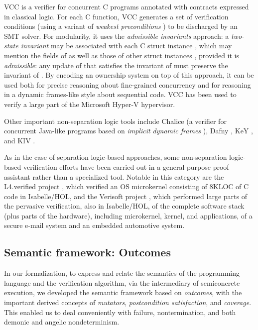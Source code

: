 \documentclass{CSML}
\theoremstyle{definition}\newtheorem{notation}[thm]{Notation}
\theoremstyle{plain}\newtheorem{satz}[thm]{Satz}
\begin{document}
VCC \cite{DBLP:conf/tphol/CohenDHLMSST09} is a verifier for concurrent C 
programs annotated with contracts expressed in classical logic. For each C 
function, VCC generates a set of verification conditions (using a variant 
of \emph{weakest preconditions} \cite{weakest-preconditions}) to be 
discharged by an SMT solver. For modularity, it uses the \emph{admissible 
invariants} approach: a \emph{two-state invariant} may be associated with 
each C struct instance , which may mention the fields of  as well as 
those of other struct instances , provided it is \emph{admissible}: 
any update of  that satisfies the invariant of  must preserve 
the invariant of . By encoding an ownership system on top of this 
approach, it can be used both for precise reasoning about fine-grained 
concurrency and for reasoning in a dynamic frames-like style about 
sequential code. VCC has been used to verify a large part of the Microsoft 
Hyper-V hypervisor. 

Other important non-separation logic tools include Chalice \cite{chalice} 
(a verifier for concurrent Java-like programs based on \emph{implicit 
dynamic frames} \cite{DBLP:journals/toplas/SmansJP12}), Dafny 
\cite{DBLP:conf/vstte/Leino12}, KeY \cite{DBLP:conf/fmoods/AhrendtBHS07}, 
and KIV \cite{kiv}.

As in the case of separation logic-based approaches, some non-separation 
logic-based verification efforts have been carried out in a 
general-purpose proof assistant rather than a specialized tool. Notable in 
this category are the L4.verified project \cite{Klein_EHACDEEKNSTW_09}, 
which verified an OS microkernel consisting of 8KLOC of C code in 
Isabelle/HOL, and the Verisoft project \cite{Alkassar:VSTTE2010-71}, which 
performed large parts of the pervasive verification, also in Isabelle/HOL, 
of the complete software stack (plus parts of the hardware), including 
microkernel, kernel, and applications, of a secure e-mail system and an 
embedded automotive system.

\subsection{Semantic framework: Outcomes}

In our formalization, to express and relate the semantics of the 
programming language and the verification algorithm, via the intermediary 
of semiconcrete execution, we developed the semantic framework based on 
\emph{outcomes}, with the important derived concepts of \emph{mutators}, 
\emph{postcondition satisfaction}, and \emph{coverage}. This enabled us to 
deal conveniently with failure, nontermination, and both demonic and 
angelic nondeterminism.
\end{document}
